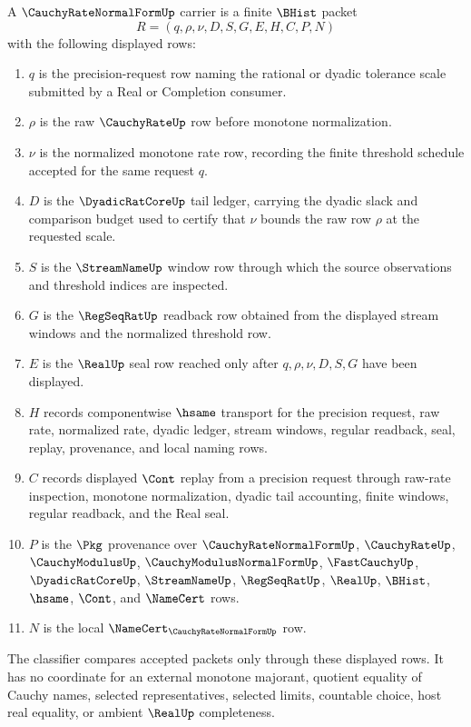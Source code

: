 \begin{definition}
\label{def:cauchy-rate-normal-form-carrier}
A $\CauchyRateNormalFormUp$ carrier is a finite $\BHist$ packet
$$
R=(q,\rho,\nu,D,S,G,E,H,C,P,N)
$$
with the following displayed rows:
\begin{enumerate}
\item $q$ is the precision-request row naming the rational or dyadic tolerance scale submitted by a Real or Completion consumer.
\item $\rho$ is the raw $\CauchyRateUp$ row before monotone normalization.
\item $\nu$ is the normalized monotone rate row, recording the finite threshold schedule accepted for the same request $q$.
\item $D$ is the $\DyadicRatCoreUp$ tail ledger, carrying the dyadic slack and comparison budget used to certify that $\nu$ bounds the raw row $\rho$ at the requested scale.
\item $S$ is the $\StreamNameUp$ window row through which the source observations and threshold indices are inspected.
\item $G$ is the $\RegSeqRatUp$ readback row obtained from the displayed stream windows and the normalized threshold row.
\item $E$ is the $\RealUp$ seal row reached only after $q,\rho,\nu,D,S,G$ have been displayed.
\item $H$ records componentwise $\hsame$ transport for the precision request, raw rate, normalized rate, dyadic ledger, stream windows, regular readback, seal, replay, provenance, and local naming rows.
\item $C$ records displayed $\Cont$ replay from a precision request through raw-rate inspection, monotone normalization, dyadic tail accounting, finite windows, regular readback, and the Real seal.
\item $P$ is the $\Pkg$ provenance over $\CauchyRateNormalFormUp$, $\CauchyRateUp$, $\CauchyModulusUp$, $\CauchyModulusNormalFormUp$, $\FastCauchyUp$, $\DyadicRatCoreUp$, $\StreamNameUp$, $\RegSeqRatUp$, $\RealUp$, $\BHist$, $\hsame$, $\Cont$, and $\NameCert$ rows.
\item $N$ is the local $\NameCert_{\CauchyRateNormalFormUp}$ row.
\end{enumerate}
The classifier compares accepted packets only through these displayed rows. It has no coordinate for an external monotone majorant, quotient equality of Cauchy names, selected representatives, selected limits, countable choice, host real equality, or ambient $\RealUp$ completeness.
\end{definition}


